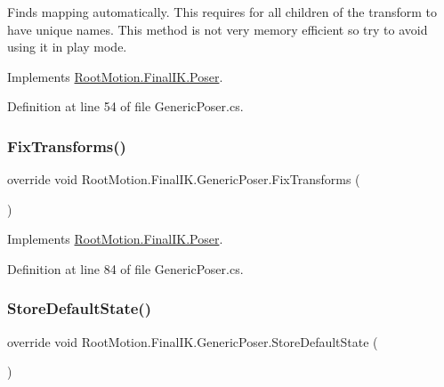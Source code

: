Finds mapping automatically. This requires for all children of the transform to have unique names. This method is not very memory efficient so try to avoid using it in play mode. 



Implements \mbox{\hyperlink{class_root_motion_1_1_final_i_k_1_1_poser_af8bf01f5bada3be99c43121b61022238}{Root\+Motion.\+Final\+I\+K.\+Poser}}.



Definition at line 54 of file Generic\+Poser.\+cs.

\mbox{\label{class_root_motion_1_1_final_i_k_1_1_generic_poser_af53f1cc65fae557e3aeaf9dd6b0181b9}} 
\subsubsection{\texorpdfstring{Fix\+Transforms()}{FixTransforms()}}
{\footnotesize\ttfamily override void Root\+Motion.\+Final\+I\+K.\+Generic\+Poser.\+Fix\+Transforms (\begin{DoxyParamCaption}{ }\end{DoxyParamCaption})\hspace{0.3cm}{\ttfamily [virtual]}}



Implements \mbox{\hyperlink{class_root_motion_1_1_final_i_k_1_1_poser_ad80c2188b9a1855ff78f3dadba42362d}{Root\+Motion.\+Final\+I\+K.\+Poser}}.



Definition at line 84 of file Generic\+Poser.\+cs.

\mbox{\label{class_root_motion_1_1_final_i_k_1_1_generic_poser_a0f4a322e84b4b5101d8a491fa4521f9e}} 
\subsubsection{\texorpdfstring{Store\+Default\+State()}{StoreDefaultState()}}
{\footnotesize\ttfamily override void Root\+Motion.\+Final\+I\+K.\+Generic\+Poser.\+Store\+Default\+State (\begin{DoxyParamCaption}{ }\end{DoxyParamCaption})\hspace{0.3cm}{\ttfamily [virtual]}}



